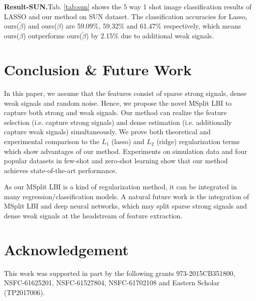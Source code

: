 \documentclass{article}
\begin{document}


\textbf{Result-SUN.}{Tab. \ref{tab:sun} shows the 5 way 1 shot image classification results of LASSO and our method on SUN dataset. The classification accuracies for Lasso, ours($\tilde{\beta}$) and ours($\beta$) are 59.09\%, 59.32\% and 61.47\% respectively, which means ours($\beta$) outperforms ours($\tilde{\beta}$) by 2.15\% due to additional weak signals.}


\section{Conclusion \& Future Work}


In this paper, we assume that the features consist of sparse strong signals, dense weak signals and random
noise.
Hence, we propose the novel MSplit LBI to capture both strong and
weak signals. Our method can realize the feature selection (i.e. capture
strong signals) and dense estimation (i.e. additionally capture weak signals) simultaneously.
We prove both theoretical and experimental comparison to the $L_{1}$
(lasso) and $L_{2}$ (ridge) regularization terms which show advantages
of our method. Experiments on simulation data and four popular datasets
in few-shot and zero-shot learning show that our method achieves state-of-the-art
performance.


As our MSplit LBI is a kind of regularization method, it can be integrated
in many regression/classification models. A natural future work is
the integration of MSplit LBI and deep neural networks, which may
split sparse strong signals and dense weak signals at the headstream
of feature extraction.


\newpage
\section*{Acknowledgement}
This work was supported in part by the following grants 973-2015CB351800, NSFC-61625201, NSFC-61527804, NSFC-61702108 and Eastern Scholar (TP2017006).


{\small{}{}{}  

 } 






\appendix
\end{document}
